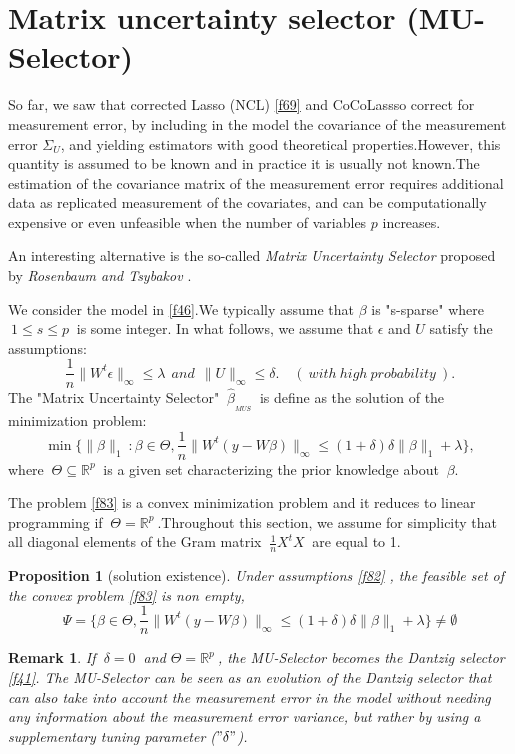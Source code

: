 \documentclass[12pt]{report}
\newtheorem {proposition}{Proposition}[section]  %
\newtheorem{remarque}{Remark}[section]
\begin{document}
\section{Matrix uncertainty selector (MU-Selector)}
So far, we saw that corrected Lasso (NCL) \eqref{f69} and CoCoLassso correct for measurement error, by including in the model the covariance of the measurement error $\Sigma_{U}$, and yielding estimators with good theoretical properties.However, this quantity is assumed to be known and in practice it is usually not known.The estimation of the covariance matrix of the measurement error requires additional data as replicated  measurement of the covariates, and can be computationally expensive or even unfeasible when the number of variables $p$ increases.

An interesting alternative is the so-called \textit{Matrix Uncertainty Selector} proposed by \textit{Rosenbaum and Tsybakov \cite{nref23}}.

We consider the model in \eqref{f46}.We typically assume that $\beta$ is "s-sparse" where $\ 1\leq s\leq p\ $ is some integer. In what follows, we assume that $\epsilon$ and $U$ satisfy the assumptions:
\begin{equation}
	\frac{1}{n}\parallel W^{t}\epsilon\parallel_{\infty}\leq\lambda\ \ and\ \ \parallel U \parallel_{\infty}\leq \delta .\quad (\ with\ high\ probability\ ).
	\label{f82}
\end{equation}
The "Matrix Uncertainty Selector" $\ \hat{\beta}_{_{MUS}}\ $ is define as the solution of the minimization problem:
\begin{equation}
	\min\bigg\{\parallel \beta \parallel_{1}\ :\beta\in \Theta, \frac{1}{n}\parallel W^{t}(y-W\beta)\parallel_{\infty}\leq (1+\delta)\delta\parallel\beta\parallel_{1}+\lambda\bigg\},
	\label{f83}
\end{equation}
where $\ \Theta \subseteq \mathbb{R}^{p}\ $ is a given set characterizing the prior knowledge about $\ \beta$.

The problem \eqref{f83} is a convex minimization problem and it reduces to linear programming if $\ \Theta=\mathbb{R}^{p}\ $.Throughout this section, we assume for simplicity that all diagonal elements of the Gram matrix $\ \frac{1}{n}X^{t}X\ $ are equal to 1.\
\begin{proposition}[solution existence]
	Under assumptions \eqref{f82} , the feasible set of the convex problem  \eqref{f83} is non empty,
	\begin{equation}
		\Psi=\bigg\{\beta\in \Theta, \frac{1}{n}\parallel W^{t}(y-W\beta)\parallel_{\infty}\leq (1+\delta)\delta\parallel\beta\parallel_{1}+\lambda\bigg\}\neq \emptyset
		\label{f84}
	\end{equation}	
\end{proposition}
\begin{remarque}
	If $\ \delta=0\ $ and $\Theta=\mathbb{R}^{p}\ $, the MU-Selector becomes the Dantzig selector \eqref{f41}.
	The MU-Selector can be seen as an evolution of the Dantzig selector that can also take into account the measurement error in the model without needing any information about the measurement error variance, but rather by using a supplementary tuning parameter ($"\delta"$).
\end{remarque}
\end{document}
